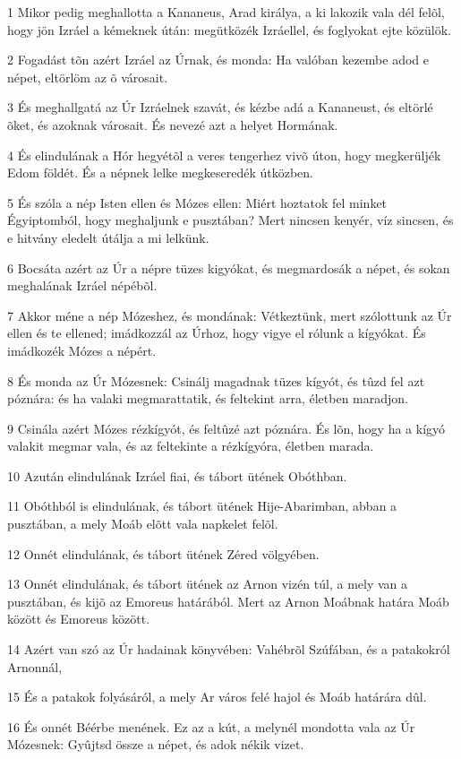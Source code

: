 \par 1 Mikor pedig meghallotta a Kananeus, Arad királya, a ki lakozik vala dél felõl, hogy jön Izráel a kémeknek útán: megütközék Izráellel, és foglyokat ejte közülök.
\par 2 Fogadást tõn azért Izráel az Úrnak, és monda: Ha valóban kezembe adod e népet, eltörlöm az õ városait.
\par 3 És meghallgatá az Úr Izráelnek szavát, és kézbe adá a Kananeust, és eltörlé õket, és azoknak városait. És nevezé azt a helyet Hormának.
\par 4 És elindulának a Hór hegyétõl a veres tengerhez vivõ úton, hogy megkerüljék Edom földét. És a népnek lelke megkeseredék útközben.
\par 5 És szóla a nép Isten ellen és Mózes ellen: Miért hoztatok fel minket Égyiptomból, hogy meghaljunk e pusztában? Mert nincsen kenyér, víz sincsen, és e hitvány eledelt útálja a  mi lelkünk.
\par 6 Bocsáta azért az Úr a népre tüzes kigyókat, és megmardosák a népet, és sokan meghalának Izráel népébõl.
\par 7 Akkor méne a nép Mózeshez, és mondának: Vétkeztünk, mert szólottunk az Úr ellen és te ellened; imádkozzál az Úrhoz, hogy vigye el rólunk a kígyókat. És imádkozék Mózes a népért.
\par 8 És monda az Úr Mózesnek: Csinálj magadnak tüzes kígyót, és tûzd fel azt póznára: és ha valaki megmarattatik, és feltekint arra, életben maradjon.
\par 9 Csinála azért Mózes rézkígyót, és feltûzé azt póznára. És lõn, hogy ha a kígyó valakit megmar vala, és az feltekinte a rézkígyóra, életben marada.
\par 10 Azután elindulának Izráel fiai, és tábort ütének Obóthban.
\par 11 Obóthból is elindulának, és tábort ütének Hije-Abarimban, abban a pusztában, a mely Moáb elõtt vala napkelet felõl.
\par 12 Onnét elindulának, és tábort ütének Zéred völgyében.
\par 13 Onnét elindulának, és tábort ütének az Arnon vizén túl, a mely van a pusztában, és kijõ az Emoreus határából. Mert az Arnon Moábnak határa Moáb között és Emoreus között.
\par 14 Azért van szó az Úr hadainak könyvében: Vahébrõl Szúfában, és a patakokról Arnonnál,
\par 15 És a patakok folyásáról, a mely Ar város felé hajol és Moáb határára dûl.
\par 16 És onnét Béérbe menének. Ez az a kút, a melynél mondotta vala az Úr Mózesnek: Gyûjtsd össze a népet, és adok nékik vizet.
